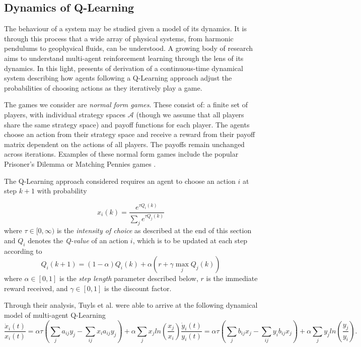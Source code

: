 \documentclass[sigconf,anonymous]{aamas}
\begin{document}
\subsection{Dynamics of Q-Learning}

The behaviour of a system may be studied given a model of its
dynamics. It is through this process that a wide array of physical
systems, from harmonic pendulums to geophysical fluids, can be
understood. A growing body of research aims to understand multi-agent
reinforcement learning through the lens of its dynamics. In this
light, \cite{Tuyls2006AnGames} presents of derivation of a continuous-time dynamical system describing how agents following a Q-Learning
approach adjust the probabilities of choosing actions as they
iteratively play a game. 

The games we consider are \textit{normal form games}. These consist of: a finite set of players, with individual strategy spaces $\mathcal{A}$ (though we assume that all players share the same strategy space) and payoff functions for each player. The agents choose an action from their strategy space and receive a reward from their payoff matrix dependent on the actions of all players. The payoffs remain unchanged across iterations. Examples of these normal form games include the popular Prisoner's Dilemma or Matching Pennies games \cite{Tuyls2006AnGames}.

The Q-Learning approach considered requires
an agent to choose an action $i$ at step $k+1$ with probability

\begin{equation}
    x_i(k) = \frac{e^{\tau Q_i(k)}}{\sum_j e^{\tau Q_j(k)}}
\end{equation}
%
where $\tau \in [0, \infty)$ is the \textit{intensity of choice} as described at the end of this section and $Q_i$ denotes the \textit{Q-value} of an action $i$, which is to be updated at each step according to
%
\begin{equation}
\label{eqn::Qupdate}
    Q_i(k+1) = (1 - \alpha) Q_i(k) + \alpha (r + \gamma \max_j Q_j(k))
\end{equation}
%
where $\alpha \in [0, 1]$ is the \textit{step length} parameter described below, $r$ is the immediate reward received, and $\gamma \in [0, 1]$ is the discount factor.

Through their analysis, Tuyls et al. were able to
arrive at the following dynamical model of multi-agent Q-Learning
%
\begin{subequations}
\label{eqn::EOM}
    \begin{equation}
        \frac{\dot{x}_i(t)}{x_i(t)} = \alpha \tau (\sum_{j} a_{ij} y_j - \sum_{i j} x_i a_{ij} y_j)
        + \alpha \sum_j x_j ln(\frac{x_j}{x_i}) 
    \end{equation}
    \begin{equation}
        \frac{\dot{y}_i(t)}{y_i(t)} = \alpha \tau (\sum_{j} b_{ij} x_j - \sum_{i j} y_i b_{ij} x_j)
        + \alpha \sum_j y_j ln(\frac{y_j}{y_i}).
    \end{equation}
\end{subequations}
\end{document}
